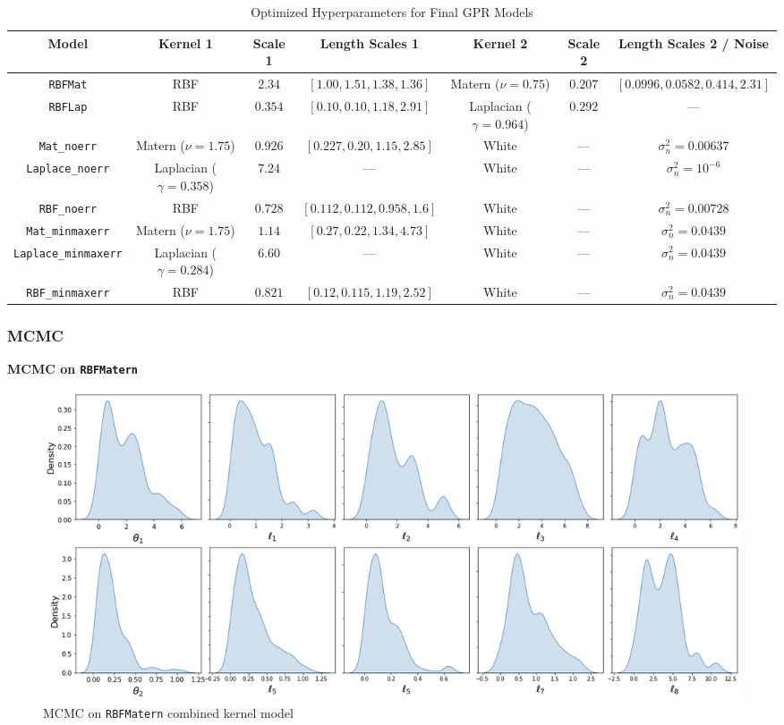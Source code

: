 \documentclass[12pt]{article}
\begin{document}
\begin{table}[H]
\centering
\caption{Optimized Hyperparameters for Final GPR Models}
\footnotesize  %
\renewcommand{\arraystretch}{1.15}  %
\setlength{\tabcolsep}{4pt}  %
\label{tab:final_gpr_hyperparams}
{\fontsize{7}{9.5}\selectfont
\begin{tabular}{|c|c|c|c|c|c|c|}
\hline
\textbf{Model} & \textbf{Kernel 1} & \textbf{Scale 1} & \textbf{Length Scales 1} & \textbf{Kernel 2} & \textbf{Scale 2} & \textbf{Length Scales 2 / Noise} \\
\hline
\texttt{RBFMat} & RBF & $2.34$ & $[1.00, 1.51, 1.38, 1.36]$ & Matern ($\nu = 0.75$) & $0.207$ & $[0.0996, 0.0582, 0.414, 2.31]$ \\
\texttt{RBFLap} & RBF & $0.354$ & $[0.10, 0.10, 1.18, 2.91]$ & Laplacian ($\gamma = 0.964$) & $0.292$ & --- \\
\texttt{Mat\_noerr} & Matern ($\nu = 1.75$) & $0.926$ & $[0.227, 0.20, 1.15, 2.85]$ & White & --- & $\sigma_n^2 = 0.00637$ \\
\texttt{Laplace\_noerr} & Laplacian ($\gamma = 0.358$) & $7.24$ & --- & White & --- & $\sigma_n^2 = 10^{-6}$ \\
\texttt{RBF\_noerr} & RBF & $0.728$ & $[0.112, 0.112, 0.958, 1.6]$ & White & --- & $\sigma_n^2 = 0.00728$ \\
\texttt{Mat\_minmaxerr} & Matern ($\nu = 1.75$) & $1.14$ & $[0.27, 0.22, 1.34, 4.73]$ & White & --- & $\sigma_n^2 = 0.0439$ \\
\texttt{Laplace\_minmaxerr} & Laplacian ($\gamma = 0.284$) & $6.60$ & --- & White & --- & $\sigma_n^2 = 0.0439$ \\
\texttt{RBF\_minmaxerr} & RBF & $0.821$ & $[0.12, 0.115, 1.19, 2.52]$ & White & --- & $\sigma_n^2 = 0.0439$ \\
\hline
\end{tabular}}
\end{table}


\subsubsection*{MCMC}
\textbf{MCMC on \texttt{RBFMatern}}
\begin{figure}[H]
    \centering
    \includegraphics[width=1\textwidth]{LatexPlots/final_gps_plots/MCMCRBFMat.png}
    \caption{MCMC on \texttt{RBFMatern} combined kernel model}
    \label{fig:MCMCRBFMatern}
\end{figure}
\end{document}
